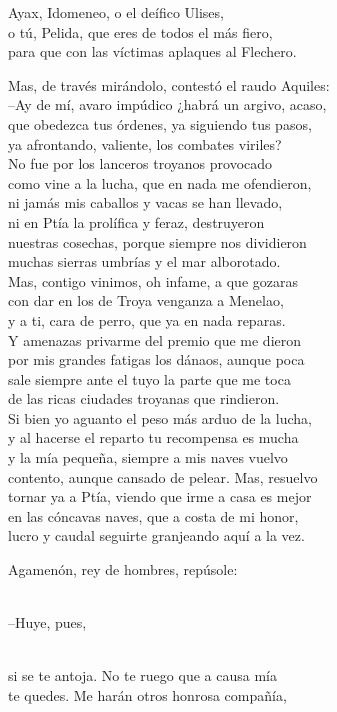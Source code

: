 \documentclass[11pt,twoside]{article}
\newcommand{\dlgo}[2]{\sbox{\dbox}{#1}\parbox[t]{\linewidth}{#1\strut\\[0pt]\hspace*{\wd\dbox}\hspace{\fontdimen2\font}#2\strut}}
\begin{document}
Ayax, Idomeneo, o el deífico Ulises,\\
o tú, Pelida, que eres de todos el más fiero,\\
para que con las víctimas aplaques al Flechero.\par
Mas, de través mirándolo, contestó el raudo Aquiles:\\
--Ay de mí, avaro impúdico ¿habrá un argivo, acaso,\\
que obedezca tus órdenes, ya siguiendo tus pasos,\\
ya afrontando, valiente, los combates viriles?\\
No fue por los lanceros troyanos provocado\\
como vine a la lucha, que en nada me ofendieron,\\
ni jamás mis caballos y vacas se han llevado,\\
ni en Ptía la prolífica y feraz, destruyeron\\
nuestras cosechas, porque siempre nos dividieron\\
muchas sierras umbrías y el mar alborotado.\\
Mas, contigo vinimos, oh infame, a que gozaras\\
con dar en los de Troya venganza a Menelao,\\
y a ti, cara de perro, que ya en nada reparas.\\
Y amenazas privarme del premio que me dieron\\
por mis grandes fatigas los dánaos, aunque poca\\
sale siempre ante el tuyo la parte que me toca\\
de las ricas ciudades troyanas que rindieron.\\
Si bien yo aguanto el peso más arduo de la lucha,\\
y al hacerse el reparto tu recompensa es mucha\\
y la mía pequeña, siempre a mis naves vuelvo\\
contento, aunque cansado de pelear. Mas, resuelvo\\
tornar ya a Ptía, viendo que irme a casa es mejor\\
en las cóncavas naves, que a costa de mi honor,\\
lucro y caudal seguirte granjeando aquí a la vez.\par
\dlgo{Agamenón, rey de hombres, repúsole:}{--Huye, pues,}\\
si se te antoja. No te ruego que a causa mía\\
te quedes. Me harán otros honrosa compañía,\\
\end{document}
